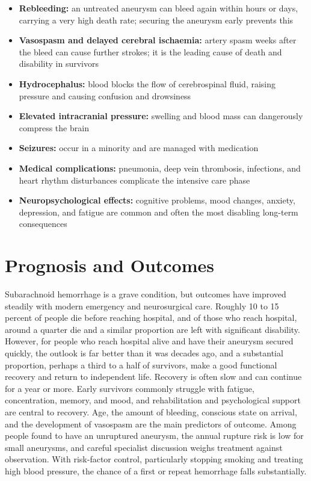 \begin{itemize}
    \item \textbf{Rebleeding:} an untreated aneurysm can bleed again within hours or days, carrying a very high death rate; securing the aneurysm early prevents this
    \item \textbf{Vasospasm and delayed cerebral ischaemia:} artery spasm weeks after the bleed can cause further strokes; it is the leading cause of death and disability in survivors
    \item \textbf{Hydrocephalus:} blood blocks the flow of cerebrospinal fluid, raising pressure and causing confusion and drowsiness
    \item \textbf{Elevated intracranial pressure:} swelling and blood mass can dangerously compress the brain
    \item \textbf{Seizures:} occur in a minority and are managed with medication
    \item \textbf{Medical complications:} pneumonia, deep vein thrombosis, infections, and heart rhythm disturbances complicate the intensive care phase
    \item \textbf{Neuropsychological effects:} cognitive problems, mood changes, anxiety, depression, and fatigue are common and often the most disabling long-term consequences
\end{itemize}

\section*{Prognosis and Outcomes}
Subarachnoid hemorrhage is a grave condition, but outcomes have improved steadily with modern emergency and neurosurgical care. Roughly 10 to 15 percent of people die before reaching hospital, and of those who reach hospital, around a quarter die and a similar proportion are left with significant disability. However, for people who reach hospital alive and have their aneurysm secured quickly, the outlook is far better than it was decades ago, and a substantial proportion, perhaps a third to a half of survivors, make a good functional recovery and return to independent life. Recovery is often slow and can continue for a year or more. Early survivors commonly struggle with fatigue, concentration, memory, and mood, and rehabilitation and psychological support are central to recovery. Age, the amount of bleeding, conscious state on arrival, and the development of vasospasm are the main predictors of outcome. Among people found to have an unruptured aneurysm, the annual rupture risk is low for small aneurysms, and careful specialist discussion weighs treatment against observation. With risk-factor control, particularly stopping smoking and treating high blood pressure, the chance of a first or repeat hemorrhage falls substantially.

